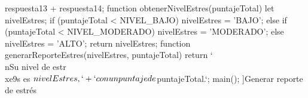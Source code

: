 \documentclass{article}
\begin{document}
{\begin{Form}
{{            respuesta13 + respuesta14;
    }
    function obtenerNivelEstres(puntajeTotal) {
        let nivelEstres;
        if (puntajeTotal < NIVEL_BAJO) {
            nivelEstres = 'BAJO';
        } else {
            if (puntajeTotal < NIVEL_MODERADO) {
                nivelEstres = 'MODERADO';
            } else {
                nivelEstres = 'ALTO';
            }
        }
        return nivelEstres;
    }
    function generarReporteEstres(nivelEstres, puntajeTotal) {
        return `\\nSu nivel de estr\\xe9s es ${nivelEstres}, `+
            `con un puntaje de ${puntajeTotal}.`;
    }
    main();
    }]{Generar reporte de estrés}
  \end{Form}
}
\end{document}
